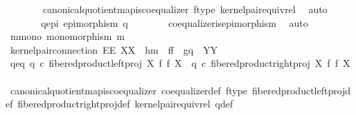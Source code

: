 \begin{isabellebody}
\ \ \ \ \ \ \isamarkupfalse%
\ canonical{\isacharunderscore}{\kern0pt}quotient{\isacharunderscore}{\kern0pt}map{\isacharunderscore}{\kern0pt}is{\isacharunderscore}{\kern0pt}coequalizer\ f{\isacharunderscore}{\kern0pt}type\ kernel{\isacharunderscore}{\kern0pt}pair{\isacharunderscore}{\kern0pt}equiv{\isacharunderscore}{\kern0pt}rel\ \isamarkupfalse%
\ auto\ \isanewline
\ \ \ \ \isamarkupfalse%
\ \isamarkupfalse%
\ q{\isacharunderscore}{\kern0pt}epi{\isacharcolon}{\kern0pt}\ {\isachardoublequoteopen}epimorphism\ q{\isachardoublequoteclose}\isanewline
\ \ \ \ \ \ \isamarkupfalse%
\ coequalizer{\isacharunderscore}{\kern0pt}is{\isacharunderscore}{\kern0pt}epimorphism\ \isamarkupfalse%
\ auto\ \isanewline
\isanewline
\ \ \ \ \isamarkupfalse%
\ m{\isacharunderscore}{\kern0pt}mono{\isacharcolon}{\kern0pt}\ {\isachardoublequoteopen}monomorphism\ m{\isachardoublequoteclose}\isanewline
\ \ \ \ \isamarkupfalse%
\ {\isacharminus}{\kern0pt}\isanewline
\ \ \ \ \ \ \isamarkupfalse%
\ kernel{\isacharunderscore}{\kern0pt}pair{\isacharunderscore}{\kern0pt}connection{\isacharbrackleft}{\kern0pt}\ E{\isacharequal}{\kern0pt}E{\isacharcomma}{\kern0pt}\ X{\isacharequal}{\kern0pt}X{\isacharcomma}{\kern0pt}\ \ h{\isacharequal}{\kern0pt}m{\isacharcomma}{\kern0pt}\ \ f{\isacharequal}{\kern0pt}f{\isacharcomma}{\kern0pt}\ \ g{\isacharequal}{\kern0pt}q{\isacharcomma}{\kern0pt}\ \ Y{\isacharequal}{\kern0pt}Y{\isacharbrackright}{\kern0pt}\isanewline
\ \ \ \ \ \ \isamarkupfalse%
\ q{\isacharunderscore}{\kern0pt}eq{\isacharcolon}{\kern0pt}\ {\isachardoublequoteopen}q\ {\isasymcirc}\isactrlsub c\ fibered{\isacharunderscore}{\kern0pt}product{\isacharunderscore}{\kern0pt}left{\isacharunderscore}{\kern0pt}proj\ X\ f\ f\ X\ {\isacharequal}{\kern0pt}\ q\ {\isasymcirc}\isactrlsub c\ fibered{\isacharunderscore}{\kern0pt}product{\isacharunderscore}{\kern0pt}right{\isacharunderscore}{\kern0pt}proj\ X\ f\ f\ X{\isachardoublequoteclose}\isanewline
\ \ \ \ \ \ \ \ \isamarkupfalse%
\ canonical{\isacharunderscore}{\kern0pt}quotient{\isacharunderscore}{\kern0pt}map{\isacharunderscore}{\kern0pt}is{\isacharunderscore}{\kern0pt}coequalizer\ coequalizer{\isacharunderscore}{\kern0pt}def\ f{\isacharunderscore}{\kern0pt}type\ fibered{\isacharunderscore}{\kern0pt}product{\isacharunderscore}{\kern0pt}left{\isacharunderscore}{\kern0pt}proj{\isacharunderscore}{\kern0pt}def\ fibered{\isacharunderscore}{\kern0pt}product{\isacharunderscore}{\kern0pt}right{\isacharunderscore}{\kern0pt}proj{\isacharunderscore}{\kern0pt}def\ kernel{\isacharunderscore}{\kern0pt}pair{\isacharunderscore}{\kern0pt}equiv{\isacharunderscore}{\kern0pt}rel\ q{\isacharunderscore}{\kern0pt}def\ \isamarkupfalse%

\end{isabellebody}
